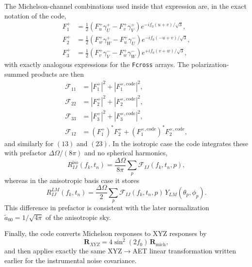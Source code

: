 \documentclass[11pt]{article}
\begin{document}
The Michelson-channel combinations used inside that expression are, in the exact notation of the code,
\begin{align}
F^{+}_{1} &= \frac{1}{2}\left(F^{+}_{u}\gamma^{+}_{U}-F^{+}_{v}\gamma^{+}_{V}\right)
e^{-if_0(u+v)/\sqrt{3}}, \\
F^{+}_{2} &= \frac{1}{2}\left(F^{+}_{w}\gamma^{+}_{W}-F^{+}_{u}\gamma^{-}_{U}\right)
e^{-if_0(-u+v)/\sqrt{3}}, \\
F^{+}_{3} &= \frac{1}{2}\left(F^{+}_{v}\gamma^{-}_{V}-F^{+}_{w}\gamma^{-}_{W}\right)
e^{+if_0(v+w)/\sqrt{3}},
\end{align}
with exactly analogous expressions for the \texttt{Fcross} arrays. The polarization-summed products are then
\begin{align}
\mathcal{F}_{11} &= |F^{+}_{1}|^2 + |F^{\times,\mathrm{code}}_{1}|^2, \\
\mathcal{F}_{22} &= |F^{+}_{2}|^2 + |F^{\times,\mathrm{code}}_{2}|^2, \\
\mathcal{F}_{33} &= |F^{+}_{3}|^2 + |F^{\times,\mathrm{code}}_{3}|^2, \\
\mathcal{F}_{12} &= (F^{+}_{1})^\ast F^{+}_{2} + (F^{\times,\mathrm{code}}_{1})^\ast F^{\times,\mathrm{code}}_{2},
\end{align}
and similarly for $(13)$ and $(23)$. In the isotropic case the code integrates these with prefactor $\Delta\Omega/(8\pi)$ and no spherical harmonics,
\begin{equation}
R^{\mathrm{iso}}_{IJ}(f_k,t_n)
=\frac{\Delta\Omega}{8\pi}\sum_p \mathcal{F}_{IJ}(f_k,t_n,p),
\end{equation}
whereas in the anisotropic basis case it stores
\begin{equation}
R^{LM}_{IJ}(f_k,t_n)
=\frac{\Delta\Omega}{2}\sum_p \mathcal{F}_{IJ}(f_k,t_n,p)\,Y_{LM}(\theta_p,\phi_p).
\end{equation}
This difference in prefactor is consistent with the later normalization $\tilde{a}_{00}=1/\sqrt{4\pi}$ of the anisotropic sky.

Finally, the code converts Michelson responses to XYZ responses by
\begin{equation}
\mathbf{R}_{XYZ}=4\sin^2(2f_0)\,\mathbf{R}_{\mathrm{mich}},
\end{equation}
and then applies exactly the same XYZ$\rightarrow$AET linear transformation written earlier for the instrumental noise covariance.
\end{document}
